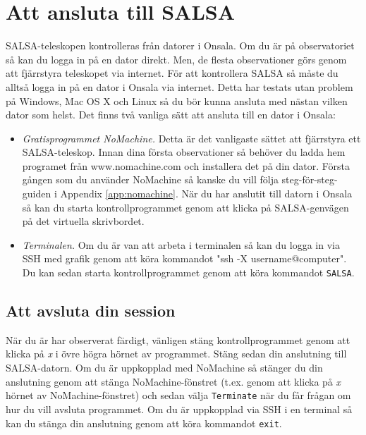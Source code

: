 \section{Att ansluta till SALSA} 
\label{sect:connect}
SALSA-teleskopen kontrolleras från datorer i Onsala. Om du är på 
observatoriet så kan du logga in på en dator direkt. Men, de flesta observationer
görs genom att fjärrstyra teleskopet via internet. För att kontrollera SALSA
så måste du alltså logga in på en dator i Onsala via internet. Detta har 
testats utan problem på Windows, Mac OS X och Linux så du bör kunna ansluta 
med nästan vilken dator som helst. Det finns två vanliga sätt att ansluta
till en dator i Onsala:

\begin{itemize}
	\item{\emph{Gratisprogrammet NoMachine.} Detta är det vanligaste
			sättet att fjärrstyra ett SALSA-teleskop. Innan dina första 
			observationer så behöver du ladda hem programet från \newline
			www.nomachine.com och installera det på din dator. Första gången
			som du använder NoMachine så kanske du vill följa steg-för-steg-guiden
			i Appendix \ref{app:nomachine}. När du har anslutit till datorn i Onsala
			så kan du starta kontrollprogrammet genom att klicka på SALSA-genvägen
		på det virtuella skrivbordet. }
\item{\emph{Terminalen.} Om du är van att arbeta i terminalen så kan du 
		logga in via SSH med grafik genom att köra kommandot 
		"ssh -X username@computer".  Du kan sedan starta kontrollprogrammet
		genom att köra kommandot {\tt  SALSA}.}
\end{itemize}

\subsection{Att avsluta din session}
När du är har observerat färdigt, vänligen stäng kontrollprogrammet genom
att klicka på \emph{x} i övre högra hörnet av programmet. Stäng sedan din 
anslutning till SALSA-datorn. Om du är uppkopplad med NoMachine så stänger
du din anslutning genom att stänga NoMachine-fönstret (t.ex. genom att
klicka på \emph{x} hörnet av NoMachine-fönstret) och sedan välja 
{\tt Terminate} när du får frågan om hur du vill avsluta programmet. 
Om du är uppkopplad via SSH i en terminal så kan du stänga din anslutning
genom att köra kommandot {\tt exit}.

